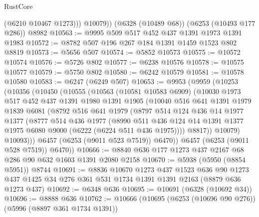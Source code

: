 \begin{lexlean}{RustCore}
\begin{coremodule}
            (@6210 @10467 @1273)))
        @10079))
    (@6328 (@10489 @68))
    (@6253 (@10493 @177 @286))
    @8982
@10563 := @9995 @509 @517 @452 @437 @1391 @1973 @1391 @1983
@10572 := @8782 @507 @196 @267 @184 @1391 @1459 @1523 @802 @8819
@10573 := @5656 @507
@10574 := @5852 @10573
@10575 := @10572 @10574
@10576 := @5726 @802
@10577 := @6238 @10576
@10578 := @10575 @10577
@10579 := @5750 @802
@10580 := @6242 @10579
@10581 := @10578 @10580
@10583 := @6247 (@6249 @507)
@10653 := @9953
    (@9959
      (@10253
        (@10356
          (@10450
            (@10555
              (@10563
                (@10581 @10583 @6909)
                (@10030
                  @1973
                  @517
                  @452
                  @437
                  @1391
                  @1980
                  @1391
                  @1905
                  (@10040
                    @516
                    @641
                    @1391
                    @1979
                    @1839
                    @6081
                    (@8792
                      @516
                      @641
                      @1979
                      (@8797
                        @514
                        @124
                        @436
                        @14
                        @1977
                        @1377
                        (@8777
                          @514
                          @436
                          @1977
                          (@8990
                            @511
                            @436
                            @124
                            @14
                            @1391
                            @1377
                            @1975
                            @6080
                            @9000
                            (@6222 (@6224 @511 @436 @1975))))
                        @8817))
                    @10079)
                  @10093)))
            @6457
            (@6253 (@9011 @523 @7519))
            @6470))
        @6457
        (@6253 (@9011 @528 @7519))
        @6470))
@10666 := @8840 @636 @177 @1273 @437 @2167 @68 @286 @90 @632 @1603 @1391 @2080 @2158
@10670 := @5938 (@5950 (@8854 @5951)) @8744
@10691 := @8836
    @10670
    @1273
    @437
    @1523
    @636
    @90
    @1273
    @437
    @1425
    @34
    @276
    @361
    @531
    @1734
    @1391
    @1391
    @2163
    (@8879 @636 @1273 @437)
@10692 := @6348 @636
@10695 := @10691 (@6328 (@10692 @34))
@10696 := @8888 @636
@10762 := @10666
    (@10695
      (@6253 (@10696 @90 @276))
      (@5996 (@8897 @361 @1734 @1391))

\end{coremodule}
\end{lexlean}
